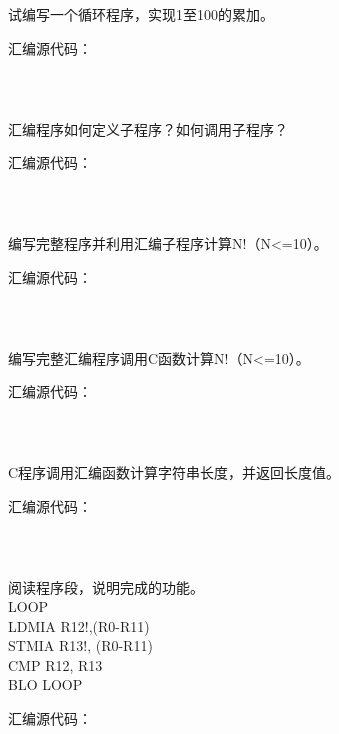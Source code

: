 \documentclass[11pt,letter,notitlepage,UTF8]{ctexart}
\begin{document}
\begin{exercise}[7.6]
	试编写一个循环程序，实现1至100的累加。	
\end{exercise}
\begin{solution}
	汇编源代码：
	\begin{lstlisting}
	
	
	\end{lstlisting}
\end{solution}
\newpage

\begin{exercise}[7.7]
	汇编程序如何定义子程序？如何调用子程序？	
\end{exercise}
\begin{solution}
	汇编源代码：
	\begin{lstlisting}
	
	
	\end{lstlisting}
\end{solution}
\newpage

\begin{exercise}[7.8]
	编写完整程序并利用汇编子程序计算N!（N<=10）。	
\end{exercise}
\begin{solution}
	汇编源代码：
	\begin{lstlisting}
	
	
	\end{lstlisting}
\end{solution}
\newpage

\begin{exercise}[7.9]
	编写完整汇编程序调用C函数计算N!（N<=10）。	
\end{exercise}
\begin{solution}
	汇编源代码：
	\begin{lstlisting}
	
	
	\end{lstlisting}
\end{solution}
\newpage

\begin{exercise}[7.10]
	C程序调用汇编函数计算字符串长度，并返回长度值。	
\end{exercise}
\begin{solution}
	汇编源代码：
	\begin{lstlisting}
	
	
	\end{lstlisting}
\end{solution}
\newpage

\begin{exercise}[7.11]
	阅读程序段，说明完成的功能。\\
	LOOP\\
	LDMIA R12!,(R0-R11)\\
	STMIA R13!, (R0-R11)\\
	CMP R12, R13\\
	BLO LOOP\\
\end{exercise}
\begin{solution}
	汇编源代码：
	\begin{lstlisting}
	
	
	\end{lstlisting}
\end{solution}
\newpage
\end{document}
